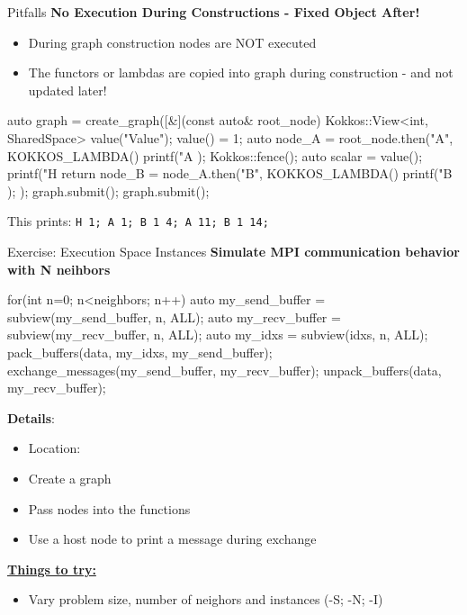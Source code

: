 \begin{frame}[fragile]{Pitfalls}
  \textbf{No Execution During Constructions - Fixed Object After!}
  \begin{itemize}
    \item{During graph construction nodes are NOT executed}
    \item{The functors or lambdas are copied into graph during construction - and not updated later!}
  \end{itemize}
\vspace{-0.7cm}
\begin{code}[linebackgroundcolor={},keywords={}]

auto graph = create_graph([&](const auto& root_node) {
  Kokkos::View<int, SharedSpace> value("Value");
  value() = 1;
  auto node_A = root_node.then("A", KOKKOS_LAMBDA() {
    printf("A %
  });
  Kokkos::fence();
  auto scalar = value();
  printf("H %
  return node_B = node_A.then("B", KOKKOS_LAMBDA() {
     printf("B %
    });
});
graph.submit();
graph.submit();
\end{code}

This prints: \texttt{H 1; A 1; B 1 4; A 11; B 1 14;}
\end{frame}

\begin{frame}[fragile]{Exercise: Execution Space Instances}
\textbf{Simulate MPI communication behavior with N neihbors}
\begin{code}
for(int n=0; n<neighbors; n++) {
  auto my_send_buffer = subview(my_send_buffer, n, ALL);
  auto my_recv_buffer = subview(my_recv_buffer, n, ALL);
  auto my_idxs = subview(idxs, n, ALL);
  pack_buffers(data, my_idxs, my_send_buffer);
  exchange_messages(my_send_buffer, my_recv_buffer);
  unpack_buffers(data, my_recv_buffer);
}
\end{code}


  \textbf{Details}:
  \begin{small}
  \begin{itemize}
\item Location: 
\item Create a graph
\item Pass nodes into the functions
\item Use a host node to print a message during exchange
\end{itemize}
  \end{small}

\ul{\textbf{Things to try:}}
  \begin{small}
  \begin{itemize}
  \item Vary problem size, number of neighors and instances (-S; -N; -I)
  \end{itemize}
  \end{small}

\end{frame}



